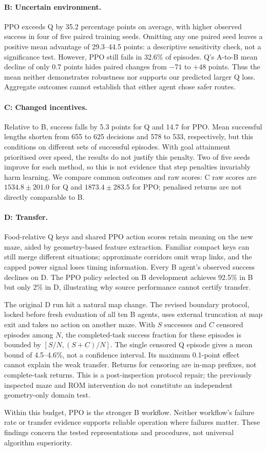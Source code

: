 \paragraph{B: Uncertain environment.}
PPO exceeds Q by 35.2 percentage points on average, with higher observed
success in four of five paired training seeds. Omitting any one paired seed leaves a positive mean
advantage of 29.3--44.5 points: a descriptive sensitivity check, not a
significance test. However, PPO still fails in 32.6\% of episodes.
Q's A-to-B mean decline of only 0.7 points hides paired changes from
$-71$ to $+48$ points. Thus the mean neither demonstrates robustness nor
supports our predicted larger Q loss. Aggregate outcomes cannot establish
that either agent chose safer routes.

\paragraph{C: Changed incentives.}
Relative to B, success falls by 5.3 points for Q and 14.7 for PPO. Mean
successful lengths shorten from 655 to 625 decisions and 578 to 533,
respectively, but this conditions on different sets of successful episodes.
With goal attainment prioritised over speed, the results do not justify
this penalty. Two of five seeds improve for each method, so this is not
evidence that step penalties invariably harm learning. We compare common
outcomes and raw scores: C raw scores are $1534.8\pm201.0$ for Q and
$1873.4\pm283.5$ for PPO; penalised returns are not directly comparable to B.

\paragraph{D: Transfer.}
Food-relative Q keys and shared PPO action scores retain meaning on the new
maze, aided by geometry-based feature extraction. Familiar compact keys can
still merge different situations; approximate corridors omit wrap links,
and the capped power signal loses timing information. Every B agent's observed success declines
on D. The PPO policy selected on B development achieves 92.5\% in B but only
2\% in D, illustrating why source performance cannot certify transfer.

The original D run hit a natural map change. The revised boundary protocol,
locked before fresh evaluation of all ten B agents, uses external truncation
at map exit and takes no action on another maze. With $S$ successes and $C$
censored episodes among $N$, the completed-task success fraction for these
episodes is bounded by $[S/N,(S+C)/N]$.
The single censored Q episode gives a mean bound of 4.5--4.6\%, not a
confidence interval. Its maximum 0.1-point effect cannot explain the weak
transfer. Returns for censoring are in-map prefixes, not complete-task returns.
This is a post-inspection protocol repair; the previously inspected maze and
ROM intervention do not constitute an independent geometry-only domain test.

Within this budget, PPO is the stronger B workflow. Neither workflow's
failure rate or transfer evidence supports reliable operation where failures
matter. These findings concern the tested representations and procedures,
not universal algorithm superiority.
